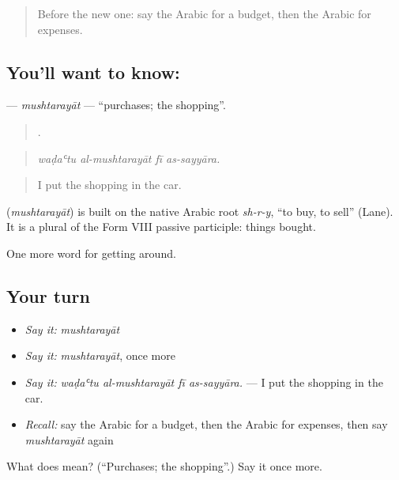 \begin{quote}
Before the new one: say the Arabic for a budget, then the Arabic for expenses.
\end{quote}

\subsection*{You'll want to know: }
\textbf{} — \emph{mushtarayāt} — \textquotedblleft{}purchases; the shopping\textquotedblright{}.

\begin{quote}
   .
\end{quote}

\begin{quote}
\emph{waḍaʿtu al-mushtarayāt fī as-sayyāra.}
\end{quote}

\begin{quote}
I put the shopping in the car.
\end{quote}

\begin{cousinweb}
\textbf{} (\emph{mushtarayāt}) is built on the native Arabic root \emph{sh-r-y}, \textquotedblleft{}to buy, to sell\textquotedblright{} (Lane). It is a plural of the Form VIII passive participle: things bought.
\end{cousinweb}

\begin{grammarlens}[title={What you've built}]
One more word for getting around.
\end{grammarlens}

\subsection*{Your turn}
\begin{itemize}
\raggedright
  \item \emph{Say it:} \emph{mushtarayāt}
  \item \emph{Say it:} \emph{mushtarayāt}, once more
  \item \emph{Say it:} \emph{waḍaʿtu al-mushtarayāt fī as-sayyāra.} — I put the shopping in the car.
  \item \emph{Recall:} say the Arabic for a budget, then the Arabic for expenses, then say \emph{mushtarayāt} again
\end{itemize}

\begin{tcolorbox}[breakable,colback=teal!4,colframe=teal!35!black,title={Before you move on}]
What does  mean? (\textquotedblleft{}Purchases; the shopping\textquotedblright{}.) Say it once more.
\end{tcolorbox}
